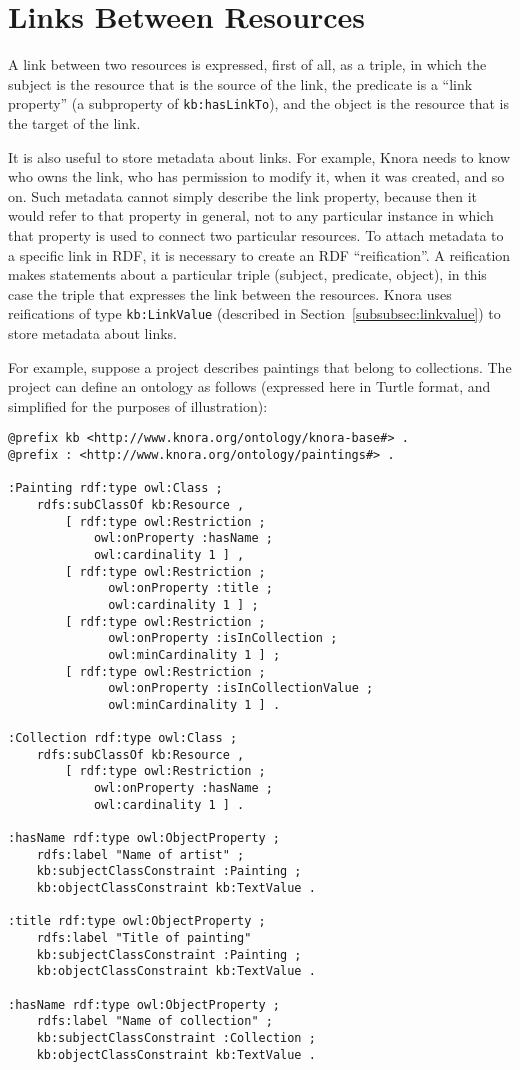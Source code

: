 \documentclass[12pt, a4paper]{article}
\begin{document}
\section{Links Between Resources}

\label{sec:links}

A link between two resources is expressed, first of all, as a triple, in which the subject is the resource that is the source of the link, the predicate is a \enquote{link property} (a subproperty of \texttt{kb:hasLinkTo}), and the object is the resource that is the target of the link.

It is also useful to store metadata about links. For example, Knora needs to know who owns the link, who has permission to modify it, when it was created, and so on. Such metadata cannot simply describe the link property, because then it would refer to that property in general, not to any particular instance in which that property is used to connect two particular resources. To attach metadata to a specific link in RDF, it is necessary to create an RDF \enquote{reification}. A reification makes statements about a particular triple (subject, predicate, object), in this case the triple that expresses the link between the resources. Knora uses reifications of type \texttt{kb:LinkValue} (described in Section~\ref{subsubsec:linkvalue}) to store metadata about links.

For example, suppose a project describes paintings that belong to collections. The project can define an ontology as follows (expressed here in Turtle format, and simplified for the purposes of illustration):

\begin{verbatim}
@prefix kb <http://www.knora.org/ontology/knora-base#> .
@prefix : <http://www.knora.org/ontology/paintings#> .

:Painting rdf:type owl:Class ;
    rdfs:subClassOf kb:Resource ,
        [ rdf:type owl:Restriction ;
            owl:onProperty :hasName ;
            owl:cardinality 1 ] ,
        [ rdf:type owl:Restriction ;
              owl:onProperty :title ;
              owl:cardinality 1 ] ;
        [ rdf:type owl:Restriction ;
              owl:onProperty :isInCollection ;
              owl:minCardinality 1 ] ;
        [ rdf:type owl:Restriction ;
              owl:onProperty :isInCollectionValue ;
              owl:minCardinality 1 ] .

:Collection rdf:type owl:Class ;
    rdfs:subClassOf kb:Resource ,
        [ rdf:type owl:Restriction ;
            owl:onProperty :hasName ;
            owl:cardinality 1 ] .
            
:hasName rdf:type owl:ObjectProperty ;
    rdfs:label "Name of artist" ;
    kb:subjectClassConstraint :Painting ;
    kb:objectClassConstraint kb:TextValue .
            
:title rdf:type owl:ObjectProperty ;
    rdfs:label "Title of painting"
    kb:subjectClassConstraint :Painting ;
    kb:objectClassConstraint kb:TextValue .

:hasName rdf:type owl:ObjectProperty ;
    rdfs:label "Name of collection" ;
    kb:subjectClassConstraint :Collection ;
    kb:objectClassConstraint kb:TextValue .
\end{verbatim}
\end{document}
